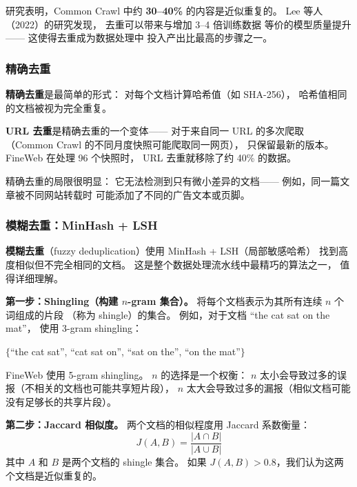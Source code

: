 研究表明，Common Crawl 中约 \textbf{30--40\%}
的内容是近似重复的。
Lee 等人（2022）的研究发现，
去重可以带来与增加 3--4 倍训练数据
等价的模型质量提升——
这使得去重成为数据处理中
投入产出比最高的步骤之一。

\subsubsection{精确去重}

\textbf{精确去重}是最简单的形式：
对每个文档计算哈希值（如 SHA-256），
哈希值相同的文档被视为完全重复。

\textbf{URL 去重}是精确去重的一个变体——
对于来自同一 URL 的多次爬取
（Common Crawl 的不同月度快照可能爬取同一网页），
只保留最新的版本。
FineWeb 在处理 96 个快照时，
URL 去重就移除了约 40\% 的数据。

精确去重的局限很明显：
它无法检测到只有微小差异的文档——
例如，同一篇文章被不同网站转载时
可能添加了不同的广告文本或页脚。

\subsubsection{模糊去重：MinHash + LSH}

\textbf{模糊去重}（fuzzy deduplication）使用
MinHash + LSH（局部敏感哈希）
找到高度相似但不完全相同的文档。
这是整个数据处理流水线中最精巧的算法之一，
值得详细理解。

\textbf{第一步：Shingling（构建 $n$-gram 集合）。}
将每个文档表示为其所有连续 $n$ 个词组成的片段
（称为 shingle）的集合。
例如，对于文档 ``the cat sat on the mat''，
使用 3-gram shingling：

\begin{center}
\small
$\{$``the cat sat'', ``cat sat on'', ``sat on the'', ``on the mat''$\}$
\end{center}

FineWeb 使用 5-gram shingling。
$n$ 的选择是一个权衡：
$n$ 太小会导致过多的误报（不相关的文档也可能共享短片段），
$n$ 太大会导致过多的漏报（相似文档可能没有足够长的共享片段）。

\textbf{第二步：Jaccard 相似度。}
两个文档的相似程度用 Jaccard 系数衡量：
\begin{equation}
  J(A, B) = \frac{|A \cap B|}{|A \cup B|}
\end{equation}
其中 $A$ 和 $B$ 是两个文档的 shingle 集合。
如果 $J(A, B) > 0.8$，我们认为这两个文档是近似重复的。


